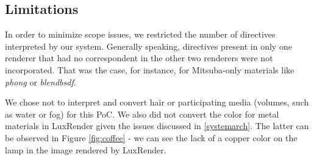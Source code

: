 
\subsection{Limitations}
In order to minimize scope issues, we restricted the number of directives 
interpreted by our system. Generally speaking, directives present in only one 
renderer that had no correspondent in the other two renderers were not 
incorporated. That was the case, for instance, for Mitsuba-only materials like 
\textit{phong} or \textit{blendbsdf}. 

We chose not to interpret and convert hair or participating media (volumes, such 
as water or fog) for this PoC. We also did not convert the color for metal 
materials in LuxRender given the issues discussed in \ref{systemarch}. The 
latter can be observed in Figure \ref{fig:coffee} - we can see the lack of a 
copper color on the lamp in the image rendered by LuxRender.




